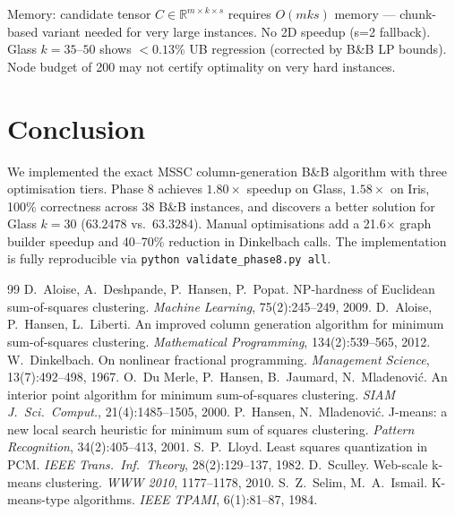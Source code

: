 \documentclass[12pt,a4paper]{article}
\begin{document}
Memory: candidate tensor $C \in \mathbb{R}^{m\times k\times s}$ requires $O(mks)$ memory — chunk-based variant needed for very large instances. No 2D speedup (s=2 fallback). Glass $k=35$--$50$ shows $<0.13\%$ UB regression (corrected by B\&B LP bounds). Node budget of 200 may not certify optimality on very hard instances.

\section{Conclusion}

We implemented the exact MSSC column-generation B\&B algorithm with three optimisation tiers. Phase 8 achieves $\mathbf{1.80\times}$ speedup on Glass, $\mathbf{1.58\times}$ on Iris, 100\% correctness across 38 B\&B instances, and discovers a better solution for Glass $k=30$ ($63.2478$ vs.\ $63.3284$). Manual optimisations add a 21.6$\times$ graph builder speedup and 40--70\% reduction in Dinkelbach calls. The implementation is fully reproducible via \texttt{python validate\_phase8.py all}.

\newpage
\begin{thebibliography}{99}
 D.\ Aloise, A.\ Deshpande, P.\ Hansen, P.\ Popat. NP-hardness of Euclidean sum-of-squares clustering. \textit{Machine Learning}, 75(2):245--249, 2009.
 D.\ Aloise, P.\ Hansen, L.\ Liberti. An improved column generation algorithm for minimum sum-of-squares clustering. \textit{Mathematical Programming}, 134(2):539--565, 2012.
 W.\ Dinkelbach. On nonlinear fractional programming. \textit{Management Science}, 13(7):492--498, 1967.
 O.\ Du Merle, P.\ Hansen, B.\ Jaumard, N.\ Mladenovi{\'c}. An interior point algorithm for minimum sum-of-squares clustering. \textit{SIAM J.\ Sci.\ Comput.}, 21(4):1485--1505, 2000.
 P.\ Hansen, N.\ Mladenovi{\'c}. J-means: a new local search heuristic for minimum sum of squares clustering. \textit{Pattern Recognition}, 34(2):405--413, 2001.
 S.\ P.\ Lloyd. Least squares quantization in PCM. \textit{IEEE Trans.\ Inf.\ Theory}, 28(2):129--137, 1982.
 D.\ Sculley. Web-scale k-means clustering. \textit{WWW 2010}, 1177--1178, 2010.
 S.\ Z.\ Selim, M.\ A.\ Ismail. K-means-type algorithms. \textit{IEEE TPAMI}, 6(1):81--87, 1984.
\end{thebibliography}
\end{document}
